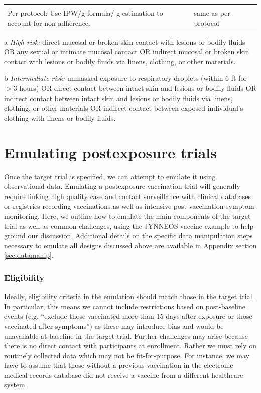 \documentclass[11pt]{article}
\begin{document}
\begin{table}[p]
\begin{threeparttable}
\begin{tabular}{>{\raggedright\arraybackslash}p{2.5cm}>{\raggedright\arraybackslash}p{7.75cm}>{\raggedright\arraybackslash}p{5cm}}
{        \\ Per protocol: Use IPW/g-formula/ g-estimation to account for non-adherence.} &  same as per protocol  \\
        \bottomrule
    \end{tabular}
    \begin{tablenotes}
        \item[a] \textit{High risk:} direct mucosal or broken skin contact with lesions or bodily fluids OR any sexual or intimate mucosal contact OR indirect mucosal or broken skin contact with lesions or bodily fluids via linens, clothing, or other materials.
        \item[b] \textit{Intermediate risk:} unmasked exposure to respiratory droplets (within 6 ft for $>$3 hours) OR direct contact between intact skin and lesions or bodily fluids OR indirect contact between intact skin and lesions or bodily fluids via linens, clothing, or other materials OR indirect contact between exposed individual's clothing with linens or bodily fluids.
    \end{tablenotes}
\end{threeparttable}
\end{table}

\section{Emulating postexposure trials}
Once the target trial is specified, we can attempt to emulate it using observational data. Emulating a postexposure vaccination trial will generally require linking high quality case and contact surveillance with clinical databases or registries recording vaccinations as well as intensive post vaccination symptom monitoring. Here, we outline how to emulate the main components of the target trial as well as common challenges, using the JYNNEOS vaccine example to help ground our discussion. Additional details on the specific data manipulation steps necessary to emulate all designs discussed above are available in Appendix section \ref{sec:datamanip}.

\subsubsection*{Eligibility}
Ideally, eligibility criteria in the emulation should match those in the target trial. In particular, this means we cannot include restrictions based on post-baseline events (e.g. ``exclude those vaccinated more than 15 days after exposure or those vaccinated after symptoms'') as these may introduce bias and would be unavailable at baseline in the target trial. Further challenges may arise because there is no direct contact with participants at enrollment. Rather we must rely on routinely collected data which may not be fit-for-purpose. For instance, we may have to assume that those without a previous vaccination in the electronic medical records database did not receive a vaccine from a different healthcare system.
\end{document}
